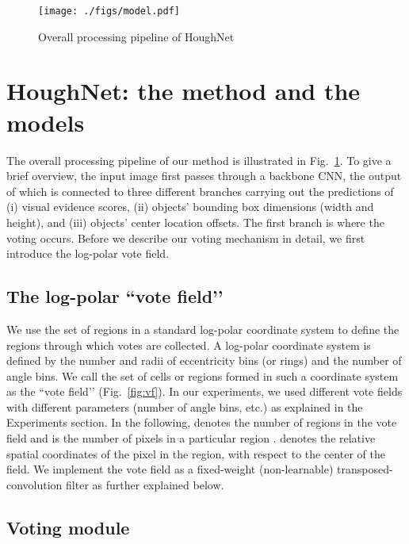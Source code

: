 \documentclass[runningheads]{llncs}
\begin{document}
\setlength\intextsep{8mm}
 \begin{figure}[t]
\texttt{[image: ./figs/model.pdf]}
\caption{Overall processing pipeline of HoughNet}
\label{fig:model}
\end{figure}
\section{HoughNet: the method and the models}




The overall processing pipeline of our method is illustrated in Fig.~\ref{fig:model}. To give a brief overview, the input image first passes through a backbone CNN, the output of which is connected to three different branches carrying out the predictions of (i) visual evidence scores, (ii) objects’ bounding box dimensions (width and height), and (iii) objects’ center location offsets. The first branch is where the voting occurs. Before we describe our voting mechanism in detail, we first introduce the log-polar vote field. 




\subsection{The log-polar ``vote field’’}




We use the set of regions in a  standard log-polar coordinate system to define the regions through which votes are collected. A log-polar coordinate system is defined by the number and radii of eccentricity bins (or rings) and the number of angle bins. We call the set of cells or regions formed in such a coordinate system as the ``vote field’’ (Fig.~\ref{fig:vf}). In our experiments, we used  different vote fields with different parameters (number of angle bins, etc.) as explained in the Experiments section. In the following,  denotes the number of regions in the vote field and  is the number of pixels in a particular region .  denotes the relative spatial coordinates of the  pixel in the  region, with respect to the center of the field. We implement the vote field as a fixed-weight (non-learnable) transposed-convolution filter as further explained below. 




\subsection{Voting module}
\end{document}
